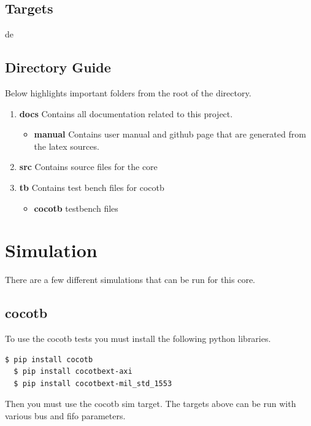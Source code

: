 \subsection{Targets}

de

\subsection{Directory Guide}

\par
Below highlights important folders from the root of the directory.

\begin{enumerate}
  \item \textbf{docs} Contains all documentation related to this project.
    \begin{itemize}
      \item \textbf{manual} Contains user manual and github page that are generated from the latex sources.
    \end{itemize}
  \item \textbf{src} Contains source files for the core
  \item \textbf{tb} Contains test bench files for cocotb
    \begin{itemize}
      \item \textbf{cocotb} testbench files
    \end{itemize}
\end{enumerate}

\newpage

\section{Simulation}
\par
There are a few different simulations that can be run for this core.

\subsection{cocotb}
\par
To use the cocotb tests you must install the following python libraries.
\begin{lstlisting}[language=bash]
  $ pip install cocotb
  $ pip install cocotbext-axi
  $ pip install cocotbext-mil_std_1553
\end{lstlisting}

Then you must use the cocotb sim target. The targets above can be run with various bus and fifo parameters.

